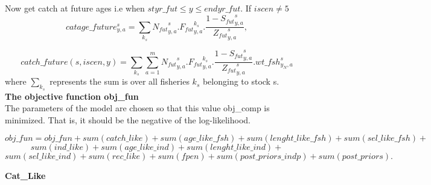 \documentclass{article}
\begin{document}
Now get catch at future ages i.e when $styr\_fut \leq y \leq endyr\_fut$. If $iscen \neq 5$
\begin{equation}
    catage\_future^s_{y,a}=\sum_{k_s} {N_{fut}}^s_{y,a}.{F_{fut}}^{k_s}_{y,a}.\dfrac{1-{S_{fut}}^s_{y,a}}{{Z_{fut}}^s_{y,a}},
\end{equation}

\begin{equation}
    catch\_future(s,iscen,y)=\sum_{k_s} \sum_{a=1}^m{N_{fut}}^s_{y,a}.{F_{fut}}^{k_s}_{y,a}.\dfrac{1-{S_{fut}}^s_{y,a}}{{Z_{fut}}^s_{y,a}}.wt\_fsh^s_{y_N,a}
\end{equation}
where $\displaystyle\sum_{k_s}$ represents the sum is over all fisheries $k_s$ belonging to stock s.\\

\textbf{The objective function obj\_fun}\\

The parameters of the model are chosen so that this value obj\_comp is minimized. That is, it should be the negative of the log-likelihood.

\begin{equation}
    obj\_fun=obj\_fun+sum(catch\_like)+sum(age\_like\_fsh)+sum(lenght\_like\_fsh)+sum(sel\_like\_fsh)+
\end{equation}
\begin{equation*}
    sum(ind\_like)+sum(age\_like\_ind)+sum(lenght\_like\_ind)+
\end{equation*}
\begin{equation*}
    sum(sel\_like\_ind)+sum(rec\_like)+sum(fpen)+sum(post\_priors\_indp)+sum(post\_priors).
\end{equation*}

\textbf{Cat\_Like}\\
\end{document}
